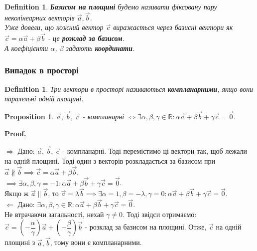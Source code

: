 \documentclass[a4paper, 10pt]{extarticle}
\makeatletter
\def\qed{$\blacksquare$}
\def\qed{$\blacksquare$}
\def\rightproof{$\boxed{\Rightarrow}$ }
\def\leftproof{$\boxed{\Leftarrow}$ }
\theoremstyle{theoremdd}
\theoremstyle{theoremdd}
\newtheorem{definition}[theorem]{Definition}
\theoremstyle{theoremdd}
\theoremstyle{theoremdd}
\theoremstyle{theoremdd}
\newtheorem{proposition}[theorem]{Proposition}
\theoremstyle{theoremdd}
\theoremstyle{theoremdd}
\theoremstyle{theoremdd}
\renewenvironment{proof}[1][Proof.\\]{\par
\pushQED{\hfill \qed}%
\normalfont \topsep6\p@\@plus6\p@\relax
\trivlist
\item\relax
{\bfseries
#1\@addpunct{.}}\hspace\labelsep\ignorespaces
}{%
\popQED\endtrivlist\@endpefalse
}
\makeatother
\begin{document}
\begin{definition}
\textbf{Базисом на площині} будемо називати фіксовану пару неколінеарних векторів $\vec{a},\vec{b}$.\\
Уже довели, що кожний вектор $\vec{c}$ виражається через базисні вектори як $\vec{c} = \alpha \vec{a} + \beta \vec{b}$ - це \textbf{розклад за базисом}.\\
А коефіцієнти $\alpha$, $\beta$ задають \textbf{координати}.
\end{definition}
	
\subsubsection{Випадок в просторі}
\begin{definition}
Три вектори в просторі називаються \textbf{компланарними}, якщо вони паралельні одній площині.
\end{definition}

\begin{proposition}
$\vec{a}$, $\vec{b}$, $\vec{c}$ - компланарні $\iff \exists \alpha, \beta, \gamma \in \mathbb{R}: \alpha \vec{a} + \beta \vec{b} + \gamma \vec{c} = \vec{0}$.
\end{proposition}

\begin{proof}
	\rightproof Дано: $\vec{a}$, $\vec{b}$, $\vec{c}$ - компланарні. Тоді перемістимо ці вектори так, щоб лежали на одній площині. Тоді один з векторів розкладається за базисом при $\vec{a} \not\parallel \vec{b} \implies \vec{c} = \alpha \vec{a} + \beta \vec{b}$.\\
	$\implies \exists \alpha, \beta, \gamma = -1: \alpha \vec{a} + \beta \vec{b} + \gamma \vec{c} = \vec{0}$.\\
	Якщо ж $\vec{a} \parallel \vec{b}$, то $\vec{a} = \lambda \vec{b}\implies \exists \alpha = 1, \beta = -\lambda, \gamma = 0: \alpha \vec{a} + \beta \vec{b} + \gamma \vec{c} = \vec{0}$.
	\bigskip \\
	\leftproof Дано: $\exists \alpha, \beta, \gamma \in \mathbb{R}: \alpha \vec{a} + \beta \vec{b} + \gamma \vec{c} = \vec{0}$.\\
	Не втрачаючи загальності, нехай $\gamma \neq 0$. Тоді звідси отримаємо:\\
	$\vec{c} = \left( -\dfrac{\alpha}{\gamma} \right) \vec{a} + \left( -\dfrac{\beta}{\gamma} \right) \vec{b}$ - розклад за базисом на площині. Отже, $\vec{c}$ на одній площині з $\vec{a},\vec{b}$, тому вони є компланарними.
\end{proof}
\end{document}

